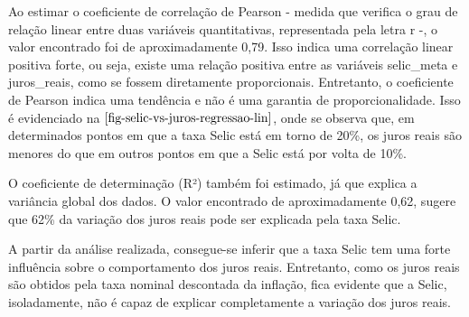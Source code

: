 \documentclass[
  portuguese,
]{estat/estat}
\begin{document}
Ao estimar o coeficiente de correlação de Pearson - medida que verifica
o grau de relação linear entre duas variáveis quantitativas,
representada pela letra r -, o valor encontrado foi de aproximadamente
0,79. Isso indica uma correlação linear positiva forte, ou seja, existe
uma relação positiva entre as variáveis selic\_meta e juros\_reais, como
se fossem diretamente proporcionais. Entretanto, o coeficiente de
Pearson indica uma tendência e não é uma garantia de proporcionalidade.
Isso é evidenciado na \(\ref{fig-selic-vs-juros-regressao-lin}\), onde
se observa que, em determinados pontos em que a taxa Selic está em torno
de 20\%, os juros reais são menores do que em outros pontos em que a
Selic está por volta de 10\%.

O coeficiente de determinação (R²) também foi estimado, já que explica a
variância global dos dados. O valor encontrado de aproximadamente 0,62,
sugere que 62\% da variação dos juros reais pode ser explicada pela taxa
Selic.

A partir da análise realizada, consegue-se inferir que a taxa Selic tem
uma forte influência sobre o comportamento dos juros reais. Entretanto,
como os juros reais são obtidos pela taxa nominal descontada da
inflação, fica evidente que a Selic, isoladamente, não é capaz de
explicar completamente a variação dos juros reais.
\end{document}
